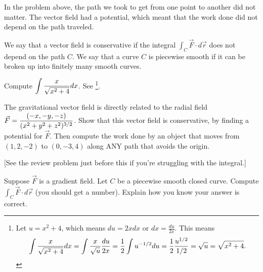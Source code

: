 In the problem above, the path we took to get from one point to another did not matter. The vector field had a potential, which meant that the work done did not depend on the path traveled. 
\begin{definition}
 We say that a vector field is conservative if the integral $\int_C \vec F\cdot d\vec r$ does not depend on the path $C$. We say that a curve $C$ is piecewise smooth if it can be broken up into finitely many smooth curves.
\end{definition}
 
\begin{review*}
 Compute $\displaystyle \int \frac{x}{\sqrt{x^2+4}}dx$. See \footnote{
Let $u=x^2+4$, which means $du=2xdx$ or $dx=\frac{du}{2x}$.  This means
$$\displaystyle \int \frac{x}{\sqrt{x^2+4}}dx 
= \int \frac{x}{\sqrt{u}}\frac{du}{2x} 
= \frac{1}{2}\int u^{-1/2}du
= \frac{1}{2}\frac{u^{1/2}}{1/2}
= \sqrt{u} = \sqrt{x^2+4}.
$$
}.
\end{review*}


\begin{problem}
 The gravitational vector field is directly related to the radial field $\displaystyle\vec F = \frac{\left(-x,-y,-z\right)}{(x^2+y^2+z^2)^{3/2}}$. Show that this vector field is conservative, by finding a potential for $\vec F$.  Then compute the work done by an object that moves from $(1,2,-2)$ to $(0,-3,4)$ along ANY path that avoids the origin. 

[See the review problem just before this if you're struggling with the integral.]
\end{problem}


\begin{problem}
 Suppose $\vec F$ is a gradient field.  Let $C$ be a piecewise smooth closed curve. Compute $\int_C \vec F\cdot d\vec r$ (you should get a number). Explain how you know your answer is correct.
\end{problem}


\newpage


